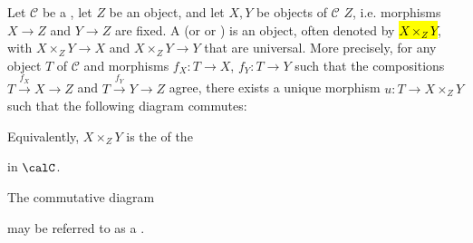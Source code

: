 \begin{definition} \label{definition:cartesian_product_of_two_objects_in_a_category_over_an_object}
    Let $\mathcal{C}$ be a , let $Z$ be an object, and let $X, Y$ be objects of $\mathcal{C}$  $Z$, i.e. morphisms $X \to Z$ and $Y \to Z$ are fixed. A  (or  or ) is an object, often denoted by \hl{$X \times_Z Y$}, with  $X \times_Z Y \to X$ and $X \times_Z Y \to Y$ that are universal. 
    More precisely, for any object $T$ of $\mathcal{C}$ and morphisms $f_X : T \to X$, $f_Y : T \to Y$ such that the compositions $T \xrightarrow{f_X} X \to Z$ and $T \xrightarrow{f_Y} Y \to Z$ agree, there exists a unique morphism $u : T \to X \times_Z Y$ such that the following diagram commutes:
        \begin{center}
        \end{center}
        Equivalently, $X \times_Z Y$ is the  of the 
        \begin{center}
        \end{center}
        in $\calC$. 

        The commutative diagram 
        \begin{center}
        \end{center}
        may be referred to as a .

\end{definition}